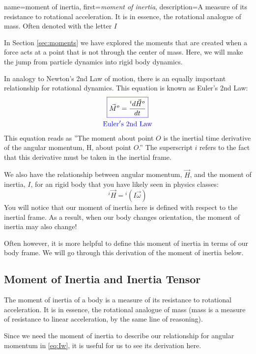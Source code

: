 \documentclass[12pt]{report}
\begin{document}
{
    name=moment of inertia,
    first={\textit{moment of inertia}},
    description={A measure of its resistance to rotational acceleration. It is in essence, the rotational analogue of mass. Often denoted with the letter $I$}
}

In Section \ref{sec:moments} we have explored the moments that are created when a force acts at a point that is not through the center of mass. Here, we will make the jump from particle dynamics into \gls{rigid body} dynamics.

In analogy to Newton's 2nd Law of motion, there is an equally important relationship for rotational dynamics. This equation is known as Euler's 2nd Law:
\begin{gather}\label{eq:Euler 2nd Law}
\color{blue}\boxed{\color{black}\vec{M}^o=\frac{{}^id\vec{H}^o}{dt}}\\
\mathrm{\color{blue}Euler's \ 2nd \ Law}
\end{gather}
This equation reads as ''The moment about point $O$ is the inertial time derivative of the angular momentum, H, about point $O$.'' The superscript $i$ refers to the fact that this derivative must be taken in the inertial frame.

We also have the relationship between angular momentum, $\vec{H}$, and the \gls{moment of inertia}, $I$, for an rigid body that you have likely seen in physics classes:
\begin{equation}\label{eq:Iw}
    {}^i\vec{H}={}^i(I\vec{\omega})
\end{equation}
You will notice that our moment of inertia here is defined with respect to the inertial frame. As a result, when our body changes orientation, the moment of inertia may also change!

Often however, it is more helpful to define this moment of inertia in terms of our body frame. We will go through this derivation of the moment of inertia below.
\subsection{Moment of Inertia and Inertia Tensor}\label{moment of inertia}
The moment of inertia of a body is a measure of its resistance to rotational acceleration. It is in essence, the rotational analogue of mass (mass is a measure of resistance to linear acceleration, by the same line of reasoning).

Since we need the moment of inertia to describe our relationship for angular momentum in \eqref{eq:Iw}, it is useful for us to see its derivation here.
\end{document}
